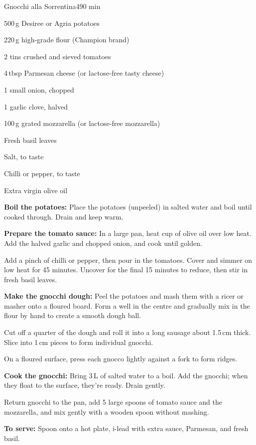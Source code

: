 \begin{recipebox}{Gnocchi alla Sorrentina}{4}{90 min}
  \begin{ingredients}
    \item 500\,g Desiree or Agria potatoes
    \item 220\,g high-grade flour (Champion brand)
    \item 2 tins crushed and sieved tomatoes
    \item 4\,tbsp Parmesan cheese (or lactose-free tasty cheese)
    \item 1 small onion, chopped
    \item 1 garlic clove, halved
    \item 100\,g grated mozzarella (or lactose-free mozzarella)
    \item Fresh basil leaves
    \item Salt, to taste
    \item Chilli or pepper, to taste
    \item Extra virgin olive oil
  \end{ingredients}

  \begin{method}
    \item \textbf{Boil the potatoes:} Place the potatoes (unpeeled) in salted water and boil until cooked through. Drain and keep warm.
    \item \textbf{Prepare the tomato sauce:} In a large pan, heat  cup of olive oil over low heat. Add the halved garlic and chopped onion, and cook until golden.
    \item Add a pinch of chilli or pepper, then pour in the tomatoes. Cover and simmer on low heat for 45 minutes. Uncover for the final 15 minutes to reduce, then stir in fresh basil leaves.
    \item \textbf{Make the gnocchi dough:} Peel the potatoes and mash them with a ricer or masher onto a floured board. Form a well in the centre and gradually mix in the flour by hand to create a smooth dough ball.
    \item Cut off a quarter of the dough and roll it into a long sausage about 1.5\,cm thick. Slice into 1\,cm pieces to form individual gnocchi.
    \item On a floured surface, press each gnocco lightly against a fork to form ridges.
    \item \textbf{Cook the gnocchi:} Bring 3\,L of salted water to a boil. Add the gnocchi; when they float to the surface, they’re ready. Drain gently.
    \item Return gnocchi to the pan, add 5 large spoons of tomato sauce and the mozzarella, and mix gently with a wooden spoon without mashing.
    \item \textbf{To serve:} Spoon onto a hot plate, i-lead  with extra sauce, Parmesan, and fresh basil.
  \end{method}


\end{recipebox}
